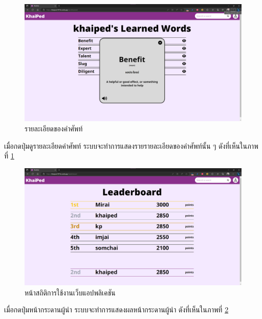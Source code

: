 \documentclass[12pt,oneside,openright,a4paper]{cpe-thai-project}
\begin{document}
\pagebreak
\begin{figure}[!h]\centering
	\includegraphics[width=\textwidth, keepaspectratio=true]{image/chap4/UI/stat/word detail.png}
	\caption{{รายละเอียดของคำศัพท์}}\label{fig:chap4UIStatWordDetail}
\end{figure}
\hspace{1cm}
เมื่อกดปุ่มดูรายละเอียดคำศัพท์ ระบบจะทำการแสดงรายรายละเอียดของคำศัพท์นั้น ๆ
ดังที่เห็นในภาพที่ \ref{fig:chap4UIStatWordDetail}

\begin{figure}[!h]\centering
	\includegraphics[width=\textwidth, keepaspectratio=true]{image/chap4/UI/stat/leaderboard.png}
	\caption{{หน้าสถิติการใช้งานเว็บแอปพลิเคชัน}}\label{fig:chap4UILead}
\end{figure}
\hspace{1cm}
เมื่อกดปุ่มหน้ากระดานผู้นำ ระบบจะทำการแสดงผลหน้ากระดานผู้นำ ดังที่เห็นในภาพที่ \ref{fig:chap4UILead}
\end{document}
